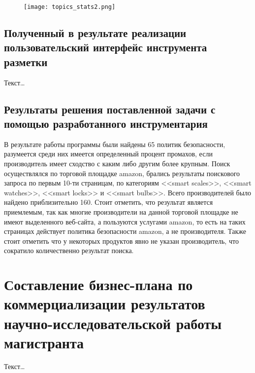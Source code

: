 \documentclass[../main]{subfiles}
\begin{document}
\begin{figure}[H]
    \centering
    {\texttt{[image: topics\_stats2.png]}}
    \vspace{-\baselineskip}
\end{figure}

\subsection{Полученный в результате реализации пользовательский интерфейс инструмента разметки}
Текст\dots

\subsection{Результаты решения поставленной задачи с помощью разработанного инструментария}
В результате работы программы были найдены 65 политик безопасности, разумеется среди них имеется определенный процент промахов, если производитель имеет сходство с каким либо другим более крупным. Поиск осуществлялся по торговой площадке amazon, брались результаты поискового запроса по первым 10-ти страницам, по категориям <<smart scales>>, <<smart watches>>, <<smart locks>> и <<smart bulbs>>. Всего производителей было найдено приблизительно 160. Стоит отметить, что результат является приемлемым, так как многие производители на данной торговой площадке не имеют выделенного веб-сайта, а пользуются услугами amazon, то есть на таких страницах действует политика безопасности amazon, а не производителя. Также стоит отметить что у некоторых продуктов явно не указан производитель, что сократило количественно результат поиска.

\newpage
\section{Составление бизнес-плана по коммерциализации результатов научно-исследовательской работы магистранта}
Текст\dots
\end{document}
